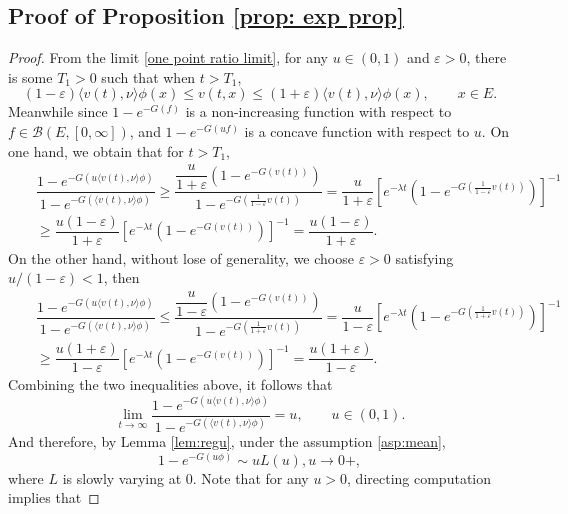 \documentclass[12pt,a4paper]{amsart}
\numberwithin{equation}{section}
\theoremstyle{plain}
\theoremstyle{definition}
\theoremstyle{remark}
\begin{document}
\subsection{Proof of Proposition \ref{prop: exp prop}}
\begin{proof}
From the limit \eqref{one point ratio limit}, for any $u\in (0,1)$ and $\varepsilon>0$, there is some $T_1>0$ such that when $t>T_1$,
\[
(1-\varepsilon)\langle v(t),\nu\rangle \phi(x)\leq v(t,x)\leq (1+\varepsilon)\langle v(t),\nu\rangle \phi(x),\qquad x\in E.
\]
Meanwhile since $1-e^{-G(f)}$ is a non-increasing function with respect to $f\in \mathcal B(E,[0,\infty])$, and $1-e^{-G(uf)}$ is a concave function with respect to $u$.  On one hand, we obtain that for $t>T_1$,
\begin{eqnarray}\label{lower}
&&\dfrac{1-e^{-G(u\langle v(t),\nu\rangle \phi)}}{1-e^{-G(\langle v(t),\nu\rangle \phi)}}\geq \dfrac{\dfrac{u}{1+\varepsilon}\left(1-e^{-G(v(t))}\right)}{1-e^{-G(\frac{1}{1-\varepsilon} v(t))}}=\dfrac{u}{1+\varepsilon}\left[e^{-\lambda t}\left(1-e^{-G(\frac{1}{1-\varepsilon} v(t))}\right)\right]^{-1}\nonumber\\
&&\geq \dfrac{u(1-\varepsilon)}{1+\varepsilon}\left[e^{-\lambda t}\left(1-e^{-G(v(t))}\right)\right]^{-1}=\dfrac{u(1-\varepsilon)}{1+\varepsilon}.
\end{eqnarray}
On the other hand, without lose of generality, we choose $\varepsilon>0$ satisfying $u/(1-\varepsilon)<1$, then
\begin{eqnarray}\label{upper}
&&\dfrac{1-e^{-G(u\langle v(t),\nu\rangle \phi)}}{1-e^{-G(\langle v(t),\nu\rangle \phi)}}\leq \dfrac{\dfrac{u}{1-\varepsilon}\left(1-e^{-G(v(t))}\right)}{1-e^{-G(\frac{1}{1+\varepsilon} v(t))}}=\dfrac{u}{1-\varepsilon}\left[e^{-\lambda t}\left(1-e^{-G(\frac{1}{1+\varepsilon} v(t))}\right)\right]^{-1}\\
&&\geq \dfrac{u(1+\varepsilon)}{1-\varepsilon}\left[e^{-\lambda t}\left(1-e^{-G(v(t))}\right)\right]^{-1}=\dfrac{u(1+\varepsilon)}{1-\varepsilon}.
\end{eqnarray}
Combining the two inequalities above, it follows that
\[
\lim_{t\to\infty}\dfrac{1-e^{-G(u\langle v(t),\nu\rangle \phi)}}{1-e^{-G(\langle v(t),\nu\rangle \phi)}}=u,\qquad u\in (0,1).
\]
And therefore, by Lemma \ref{lem:regu}, under the assumption \ref{asp:mean},
\begin{equation}\label{eq regu}
1-e^{-G(u\phi)}\sim uL(u), u\rightarrow 0+,
\end{equation}
where $L$ is slowly varying at $0$.  Note that for any $u>0$, directing computation implies that

\end{proof}
\end{document}

